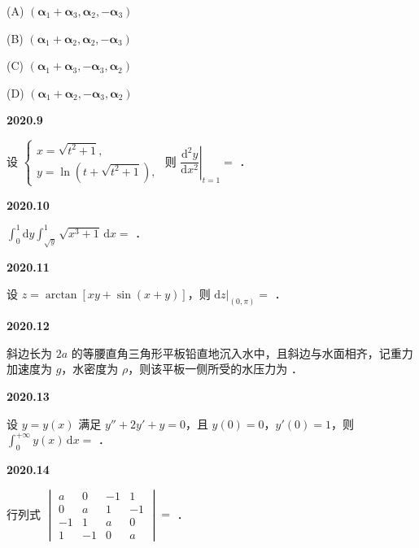 \documentclass[UTF8,12pt,fontset=windows]{ctexart}
\begin{document}
(A) $(\boldsymbol{\alpha}_1 + \boldsymbol{\alpha}_3, \boldsymbol{\alpha}_2, -\boldsymbol{\alpha}_3)$

(B) $(\boldsymbol{\alpha}_1 + \boldsymbol{\alpha}_2, \boldsymbol{\alpha}_2, -\boldsymbol{\alpha}_3)$

(C) $(\boldsymbol{\alpha}_1 + \boldsymbol{\alpha}_3, -\boldsymbol{\alpha}_3, \boldsymbol{\alpha}_2)$

(D) $(\boldsymbol{\alpha}_1 + \boldsymbol{\alpha}_2, -\boldsymbol{\alpha}_3, \boldsymbol{\alpha}_2)$

\vfill
\newpage
{\large\bfseries 2020.9}

设 $\begin{cases} x = \sqrt{t^2+1}, \\ y = \ln(t + \sqrt{t^2+1}), \end{cases}$ 则 $\left.\dfrac{\mathrm{d}^2 y}{\mathrm{d}x^2}\right|_{t=1} =$ \underline{\hspace{20mm}}．

\vfill
\newpage
{\large\bfseries 2020.10}

$\displaystyle\int_{0}^{1}\mathrm{d}y\int_{\sqrt{y}}^{1} \sqrt{x^3+1}\,\mathrm{d}x =$ \underline{\hspace{20mm}}．

\vfill
\newpage
{\large\bfseries 2020.11}

设 $z = \arctan[xy + \sin(x+y)]$，则 $\mathrm{d}z\big|_{(0,\pi)} =$ \underline{\hspace{20mm}}．

\vfill
\newpage
{\large\bfseries 2020.12}

斜边长为 $2a$ 的等腰直角三角形平板铅直地沉入水中，且斜边与水面相齐，记重力加速度为 $g$，水密度为 $\rho$，则该平板一侧所受的水压力为 \underline{\hspace{20mm}}．

\vfill
\newpage
{\large\bfseries 2020.13}

设 $y = y(x)$ 满足 $y'' + 2y' + y = 0$，且 $y(0) = 0$，$y'(0) = 1$，则 $\displaystyle\int_{0}^{+\infty} y(x)\,\mathrm{d}x =$ \underline{\hspace{20mm}}．

\vfill
\newpage
{\large\bfseries 2020.14}

行列式 $\begin{vmatrix} a & 0 & -1 & 1 \\ 0 & a & 1 & -1 \\ -1 & 1 & a & 0 \\ 1 & -1 & 0 & a \end{vmatrix} =$ \underline{\hspace{20mm}}．
\end{document}
